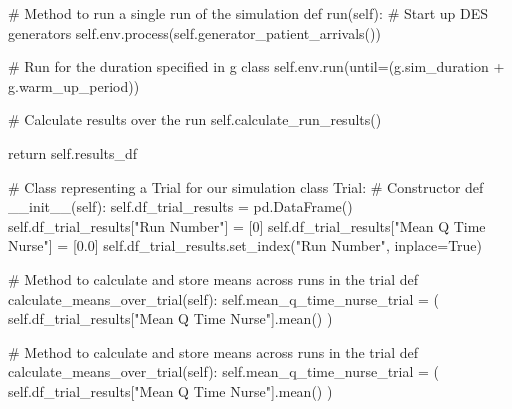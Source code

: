 \documentclass[
  letterpaper,
  DIV=11,
  numbers=noendperiod]{scrreprt}
\newenvironment{Shaded}{\begin{snugshade}}{\end{snugshade}}
\newcommand{\CommentTok}[1]{\textcolor[rgb]{0.37,0.37,0.37}{#1}}
\newcommand{\ControlFlowTok}[1]{\textcolor[rgb]{0.00,0.23,0.31}{#1}}
\newcommand{\DecValTok}[1]{\textcolor[rgb]{0.68,0.00,0.00}{#1}}
\newcommand{\FloatTok}[1]{\textcolor[rgb]{0.68,0.00,0.00}{#1}}
\newcommand{\FunctionTok}[1]{\textcolor[rgb]{0.28,0.35,0.67}{#1}}
\newcommand{\KeywordTok}[1]{\textcolor[rgb]{0.00,0.23,0.31}{#1}}
\newcommand{\NormalTok}[1]{\textcolor[rgb]{0.00,0.23,0.31}{#1}}
\newcommand{\OperatorTok}[1]{\textcolor[rgb]{0.37,0.37,0.37}{#1}}
\newcommand{\StringTok}[1]{\textcolor[rgb]{0.13,0.47,0.30}{#1}}
\newcommand{\VariableTok}[1]{\textcolor[rgb]{0.07,0.07,0.07}{#1}}
\begin{document}
\begin{tcolorbox}
\begin{Shaded}
\begin{Highlighting}[]
    \CommentTok{\# Method to run a single run of the simulation}
    \KeywordTok{def}\NormalTok{ run(}\VariableTok{self}\NormalTok{):}
        \CommentTok{\# Start up DES generators}
        \VariableTok{self}\NormalTok{.env.process(}\VariableTok{self}\NormalTok{.generator\_patient\_arrivals())}

        \CommentTok{\# Run for the duration specified in g class}
        \VariableTok{self}\NormalTok{.env.run(until}\OperatorTok{=}\NormalTok{(g.sim\_duration }\OperatorTok{+}\NormalTok{ g.warm\_up\_period))}

        \CommentTok{\# Calculate results over the run}
        \VariableTok{self}\NormalTok{.calculate\_run\_results()}

        \ControlFlowTok{return} \VariableTok{self}\NormalTok{.results\_df}

\CommentTok{\# Class representing a Trial for our simulation}
\KeywordTok{class}\NormalTok{ Trial:}
    \CommentTok{\# Constructor}
    \KeywordTok{def}  \FunctionTok{\_\_init\_\_}\NormalTok{(}\VariableTok{self}\NormalTok{):}
        \VariableTok{self}\NormalTok{.df\_trial\_results }\OperatorTok{=}\NormalTok{ pd.DataFrame()}
        \VariableTok{self}\NormalTok{.df\_trial\_results[}\StringTok{"Run Number"}\NormalTok{] }\OperatorTok{=}\NormalTok{ [}\DecValTok{0}\NormalTok{]}
        \VariableTok{self}\NormalTok{.df\_trial\_results[}\StringTok{"Mean Q Time Nurse"}\NormalTok{] }\OperatorTok{=}\NormalTok{ [}\FloatTok{0.0}\NormalTok{]}
        \VariableTok{self}\NormalTok{.df\_trial\_results.set\_index(}\StringTok{"Run Number"}\NormalTok{, inplace}\OperatorTok{=}\VariableTok{True}\NormalTok{)}

    \CommentTok{\# Method to calculate and store means across runs in the trial}
    \KeywordTok{def}\NormalTok{ calculate\_means\_over\_trial(}\VariableTok{self}\NormalTok{):}
        \VariableTok{self}\NormalTok{.mean\_q\_time\_nurse\_trial }\OperatorTok{=}\NormalTok{ (}
            \VariableTok{self}\NormalTok{.df\_trial\_results[}\StringTok{"Mean Q Time Nurse"}\NormalTok{].mean()}
\NormalTok{        )}

    \CommentTok{\# Method to calculate and store means across runs in the trial}
    \KeywordTok{def}\NormalTok{ calculate\_means\_over\_trial(}\VariableTok{self}\NormalTok{):}
        \VariableTok{self}\NormalTok{.mean\_q\_time\_nurse\_trial }\OperatorTok{=}\NormalTok{ (}
            \VariableTok{self}\NormalTok{.df\_trial\_results[}\StringTok{"Mean Q Time Nurse"}\NormalTok{].mean()}
\NormalTok{        )}


\end{Highlighting}
\end{Shaded}
\end{tcolorbox}
\end{document}

